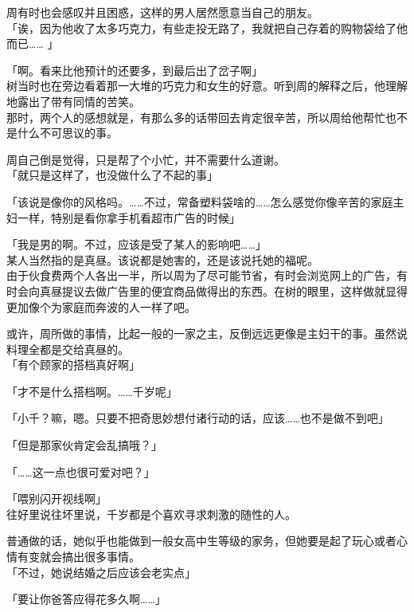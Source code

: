 周有时也会感叹并且困惑，这样的男人居然愿意当自己的朋友。\\

「诶，因为他收了太多巧克力，有些走投无路了，我就把自己存着的购物袋给了他而已…… 」

「啊。看来比他预计的还要多，到最后出了岔子啊」\\

树当时也在旁边看着那一大堆的巧克力和女生的好意。听到周的解释之后，他理解地露出了带有同情的苦笑。\\

那时，两个人的感想就是，有那么多的话带回去肯定很辛苦，所以周给他帮忙也不是什么不可思议的事。

周自己倒是觉得，只是帮了个小忙，并不需要什么道谢。\\

「就只是这样了，也没做什么了不起的事」

「该说是像你的风格吗。……不过，常备塑料袋啥的……怎么感觉你像辛苦的家庭主妇一样，特别是看你拿手机看超市广告的时候」

「我是男的啊。不过，应该是受了某人的影响吧……」\\

某人当然指的是真昼。该说都是她害的，还是该说托她的福呢。\\

由于伙食费两个人各出一半，所以周为了尽可能节省，有时会浏览网上的广告，有时会向真昼提议去做广告里的便宜商品做得出的东西。在树的眼里，这样做就显得更加像个为家庭而奔波的人一样了吧。

或许，周所做的事情，比起一般的一家之主，反倒远远更像是主妇干的事。虽然说料理全都是交给真昼的。\\

「有个顾家的搭档真好啊」

「才不是什么搭档啊。……千岁呢」

「小千？嘛，嗯。只要不把奇思妙想付诸行动的话，应该……也不是做不到吧」

「但是那家伙肯定会乱搞哦？」

「……这一点也很可爱对吧？」

「喂别闪开视线啊」\\

往好里说往坏里说，千岁都是个喜欢寻求刺激的随性的人。

普通做的话，她似乎也能做到一般女高中生等级的家务，但她要是起了玩心或者心情有变就会搞出很多事情。\\

「不过，她说结婚之后应该会老实点」

「要让你爸答应得花多久啊……」\\

